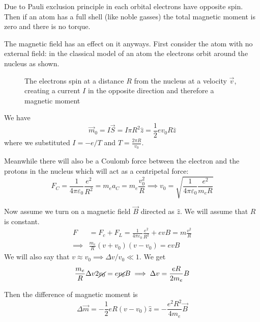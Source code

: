 \documentclass[12pt]{extarticle}
\begin{document}
Due to Pauli exclusion principle in each orbital electrons have opposite spin.
Then if an atom has a full shell (like noble gasses) the total magnetic moment is zero and there is no torque.

The magnetic field has an effect on it anyways.
First consider the atom with no external field: in the classical model of an atom the electrons orbit around the nucleus
as shown.

\begin{figure}[H]
    \centering
    
    \caption{The electrons spin at a distance $R$ from the nucleus at a velocity $\vec v$,
        creating a current $I$ in the opposite direction and therefore a magnetic moment}
\end{figure}

We have
\begin{equation}
    \vec m_0 = I \vec S = I \pi R^2 \hat z = \frac{1}{2}e v_0 R \hat z
\end{equation}
where we substituted $I = -e/T$ and $T = \frac{2\pi R}{v_0}$.

Meanwhile there will also be a Coulomb force between the electron and the protons in the nucleus
which will act as a centripetal force:
\begin{equation}
    F_C = \frac{1}{4 \pi \varepsilon_0} \frac{e^2}{R^2} = m_e a_C = m_e \frac{v_0^2}{R}
    \implies v_0 = \sqrt{\frac{1}{4 \pi \varepsilon_0} \frac{e^2}{m_e R}}
\end{equation}

Now assume we turn on a magnetic field $\vec B$ directed as $\hat z$.
We will assume that $R$ is constant.
\begin{align}
    F        & = F_c + F_L = \frac{1}{4 \pi \varepsilon_0} \frac{e^2}{R^2} + e v B = m \frac{v^2}{R} \\
    \implies & \frac{m_e}{R} (v+v_0)(v- v_0) = evB
\end{align}
We will also say that $v \approx v_0 \implies \Delta v/v_0 \ll 1$.
We get
\begin{equation}
    \frac{m_e}{R}\Delta v 2 \cancel{v_0} = e \cancel{v_0} B \implies \Delta v = \frac{e R}{2m_e}B
\end{equation}

Then the difference of magnetic moment is
\begin{equation}
    \Delta \vec m = -\frac{1}{2} e R (v-v_0) \hat z = -\frac{e^2R^2}{4 m_e} \vec B
\end{equation}
\end{document}
